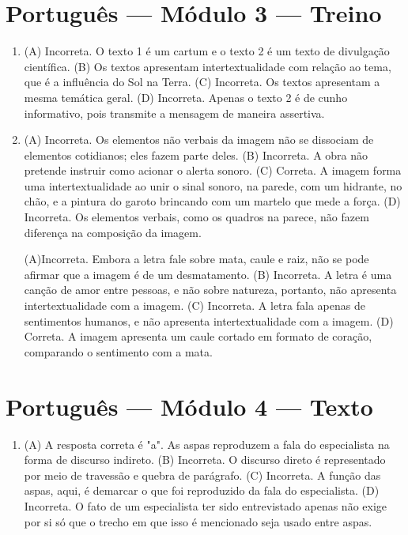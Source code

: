 \section*{Português — Módulo 3 — Treino}

\begin{enumerate}
\item (A) Incorreta. O texto 1 é um cartum e o texto 2 é um texto de divulgação
científica.
(B) Os textos apresentam intertextualidade com relação ao tema, que é a
influência do Sol na Terra.
(C) Incorreta. Os textos apresentam a mesma temática geral.
(D) Incorreta. Apenas o texto 2 é de cunho informativo, pois transmite a
mensagem de maneira assertiva.

\item (A) Incorreta. Os elementos não verbais da imagem não se dissociam de
elementos cotidianos; eles fazem parte deles.
(B) Incorreta. A obra não pretende instruir como acionar o alerta sonoro.
(C) Correta. A imagem forma uma intertextualidade ao unir o sinal sonoro,
na parede, com um hidrante, no chão, e a pintura do garoto brincando com
um martelo que mede a força.
(D) Incorreta. Os elementos verbais, como os quadros na parece, não fazem
diferença na composição da imagem.

(A)Incorreta. Embora a letra fale sobre mata, caule e raiz, não se pode
afirmar que a imagem é de um desmatamento.
(B) Incorreta. A letra é uma canção de amor entre pessoas, e não sobre
natureza, portanto, não apresenta intertextualidade com a imagem.
(C) Incorreta. A letra fala apenas de sentimentos humanos, e não
apresenta intertextualidade com a imagem.
(D) Correta. A imagem apresenta um caule cortado em formato de coração,
comparando o sentimento com a mata.
\end{enumerate}

\section*{Português — Módulo 4 — Texto}

\begin{enumerate}
\item (A) A resposta correta é "a". As aspas reproduzem a fala do especialista na forma de discurso indireto.
(B)  Incorreta. O discurso direto é representado por meio de travessão e
quebra de parágrafo.
(C)  Incorreta. A função das aspas, aqui, é demarcar o que foi
reproduzido da fala do especialista.
(D)  Incorreta. O fato de um especialista ter sido entrevistado apenas
não exige por si só que o trecho em que isso é mencionado seja usado
entre aspas.
\end{enumerate}

